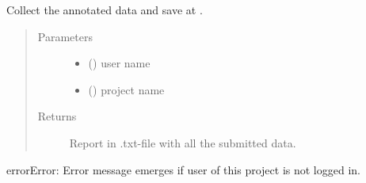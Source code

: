 \documentclass[a4paper,12pt,english]{sphinxmanual}
\begin{document}
\begin{fulllineitems}
\label{\detokenize{project_rst/user_rst/routes:project.user.outputs.get_report}}
Collect the annotated data and save at .
\begin{quote}\begin{description}
\item[{Parameters}] \leavevmode\begin{itemize}
\item {} 
 () \textendash{} user name

\item {} 
 () \textendash{} project name

\end{itemize}

\item[{Returns}] \leavevmode
Report in .txt-file with all the submitted data.

\end{description}\end{quote}

\begin{sphinxadmonition}{error}{Error:}
Error message emerges if user of this project is not logged in.
\end{sphinxadmonition}

\end{fulllineitems}

\end{document}
